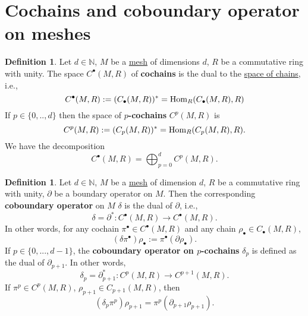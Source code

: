 \documentclass[fleqn]{article}
\theoremstyle{definition}
\newtheorem{definition}[theorem]{Definition}
\newcommand{\N}{\mathbb{N}}
\newcommand{\Hom}{\mathop{\rm Hom}\nolimits}
\begin{document}
\section{Cochains and coboundary operator on meshes}

\begin{definition}
  Let
    $d \in \N$,
    $M$ be a \hyperref[idec:mesh:definition]{mesh} of dimensions $d$,
    $R$ be a commutative ring with unity.
  The space $C^\bullet(M, R)$ of \textbf{cochains} is the dual to the
  \hyperref[idec:mesh_chain:definition]{space of chains}, i.e.,
  \begin{equation}
    C^\bullet(M, R) := (C_\bullet(M, R))^* = \Hom_R(C_\bullet(M, R), R)
  \end{equation}
  If $p \in \{0, .., d\}$ then the space of \textbf{$p$-cochains} $C^p(M, R)$ is
  \begin{equation}
    C^p(M, R) := (C_p(M, R))^* = \Hom_R(C_p(M, R), R).
  \end{equation}
  We have the decomposition
  \begin{equation}
    C^\bullet(M, R) = \bigoplus_{p = 0}^d C^p(M, R).
  \end{equation}
\end{definition}

\begin{definition}
  Let
    $d \in \N$,
    $M$ be a \hyperref[idec:mesh:definition]{mesh} of dimension $d$,
    $R$ be a commutative ring with unity,
    $\partial$ be a boundary operator on $M$.
  Then the corresponding \textbf{coboundary operator} on $M$ $\delta$ is the
  dual of $\partial$, i.e.,
  \begin{equation}
    \delta = \partial^* \colon C^\bullet(M, R) \to C^\bullet(M, R).
  \end{equation}
  In other words, for any cochain $\pi^\bullet \in C^\bullet(M, R)$ and any
  chain $\rho_\bullet \in C_\bullet(M, R)$,
  \begin{equation}
    (\delta \pi^\bullet) \rho_\bullet := \pi^\bullet(\partial \rho_\bullet).
  \end{equation}
  If $p \in \{0, ..., d - 1\}$, the \textbf{coboundary operator on $p$-cochains}
  $\delta_p$ is defined as the dual of $\partial_{p + 1}$.
  In other words,
  \begin{equation}
    \delta_p = \partial_{p + 1}^* \colon C^p(M, R) \to C^{p + 1}(M, R).
  \end{equation}
  If $\pi^p \in C^p(M, R)$, $\rho_{p + 1} \in C_{p + 1}(M, R)$, then
  \begin{equation}
    (\delta_p \pi^p) \rho_{p + 1} = \pi^p(\partial_{p + 1} \rho_{p + 1}).
  \end{equation}
\end{definition}
\end{document}
